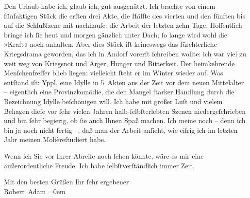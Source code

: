 \pstart
           Den Urlaub habe ich, glaub ich, gut ausgenützt. Ich brachte von einem fünfaktigen Stück die erſten drei Akte, die
               Hälfte des vierten und den fünften bis auf die Schlußſzene mit nachhauſe: die Arbeit
               der letzten zehn Tage. Hoffentlich bringe ich{ }ſie heut und morgen gänzlich unter
               Dach;{ }ſo lange wird wohl die {\pb}»Kraft« noch
               anhalten. Aber dies Stück iſt keineswegs das fürchterliche Kriegsdrama geworden, das ich in Andorf vorerſt{ }ſchreiben wollte: ich war viel zu
               weit weg von Kriegsnot und Ärger, Hunger und Bitterkeit. Der heimkehrende
               Menſchenfreſſer blieb liegen: vielleicht{ }ſteht er im Winter wieder auf. Was entſtand
               iſt: Yppl, eine Idylle in 5 Akten aus der Zeit
               vor dem neuen Mittelalter – eigentlich eine Provinzkomödie, die den Mangel{ }ſtarker
               Handlung durch die Bezeichnung Idylle beſchönigen will. Ich habe mit großer Luſt und
               vielem Behagen dieſe vor{ }ſehr vielen Jahren halb-ſelbſterlebten Szenen
               niedergeſchrieben und bin{ }ſehr begierig, ob{ }ſie auch Ihnen Spaß machen. Ich meine
               noch – denn ich bin ja noch nicht fertig –, daß man der Arbeit anſieht, wie eifrig
               ich im letzten Jahr meinen Molièreſtudiert habe.\pend
           
\pstart
           {\pb}Wenn ich Sie vor Ihrer Abreiſe noch{ }ſehen
               könnte, wäre es mir \introOben{}eine\introOben{} außerordentliche Freude. Ich habe{ }ſelbſtverſtändlich immer Zeit.\pend
           
\pstart
           Mit den besten Grüßen Ihr{ }ſehr ergebener{\\[\baselineskip]}\spacefill\mbox{Robert Adam}\pend
           \leftskip=0em{}\endnumbering{}  \newcommand{\dateiname}{L02291}\newcommand{\titel}{Robert Adam an Arthur Schnitzler, 29. 7. 1918}\newcommand{\editorInnen}{Martin Anton Müller und Gerd-Hermann Susen}
